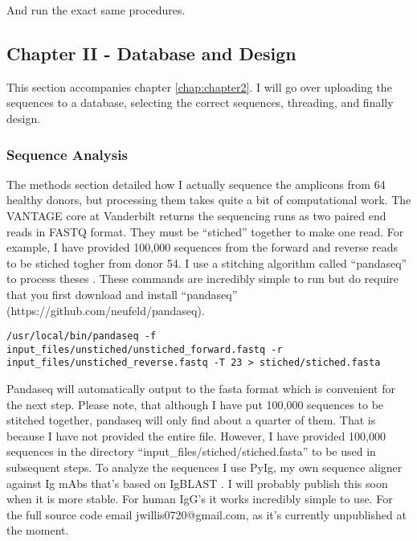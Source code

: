 And run the exact same procedures.

\subsection{Chapter II - Database and Design}
This section accompanies chapter \ref{chap:chapter2}. I will go over uploading the sequences to a database, selecting the correct sequences, threading, and finally design.

\subsubsection{Sequence Analysis}
The methods section detailed how I actually sequence the amplicons from 64 healthy donors, but processing them takes quite a bit of computational work. The VANTAGE core at Vanderbilt returns the sequencing runs as two paired end reads in FASTQ format. They must be ``stiched'' together to make one read. For example, I have provided 100,000 sequences from the forward and reverse reads to be stiched togher from donor 54. I use a stitching algorithm called ``pandaseq'' to process theses \citep{Bartram:2011cz}. These commands are incredibly simple to run but do require that you first download and install ``pandaseq'' (https://github.com/neufeld/pandaseq).

\begin{lstlisting}[breaklines=true]
/usr/local/bin/pandaseq -f input_files/unstiched/unstiched_forward.fastq -r input_files/unstiched_reverse.fastq -T 23 > stiched/stiched.fasta
\end{lstlisting}

Pandaseq will automatically output to the fasta format which is convenient for the next step. Please note, that although I have put 100,000 sequences to be stitched together, pandaseq will only find about a quarter of them. That is because I have not provided the entire file. However, I have provided 100,000 sequences in the directory ``input\_files/stiched/stiched.fasta'' to be used in subsequent steps. To analyze the sequences I use PyIg, my own sequence aligner against Ig mAbs that's based on IgBLAST \citep{Ye:2013bb}. I will probably publish this soon when it is more stable. For human IgG's it works incredibly simple to use. For the full source code email jwillis0720@gmail.com, as it's currently unpublished at the moment.

